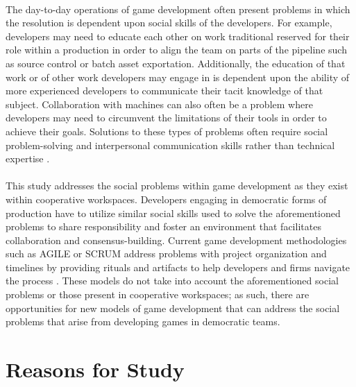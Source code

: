 
\paragraph{} The day-to-day operations of game development often present problems in which the resolution is dependent upon social skills of the developers. For example, developers may need to educate each other on work traditional reserved for their role within a production in order to align the team on parts of the pipeline such as source control or batch asset exportation. Additionally, the education of that work or of other work developers may engage in is dependent upon the ability of more experienced developers to communicate their tacit knowledge of that subject. Collaboration with machines can also often be a problem where developers may need to circumvent the limitations of their tools in order to achieve their goals. Solutions to these types of problems often require social problem-solving and interpersonal communication skills rather than technical expertise \autocite{whitson_what_2020}.

\paragraph{} This study addresses the social problems within game development as they exist within cooperative workspaces. Developers engaging in democratic forms of production have to utilize similar social skills used to solve the aforementioned problems to share responsibility and foster an environment that facilitates collaboration and consensus-building. Current game development methodologies such as AGILE or SCRUM address problems with project organization and timelines by providing rituals and artifacts to help developers and firms navigate the process \autocite{keith_agile_2020}. These models do not take into account the aforementioned social problems or those present in cooperative workspaces; as such, there are opportunities for new models of game development that can address the social problems that arise from developing games in democratic teams.

\section{Reasons for Study}

